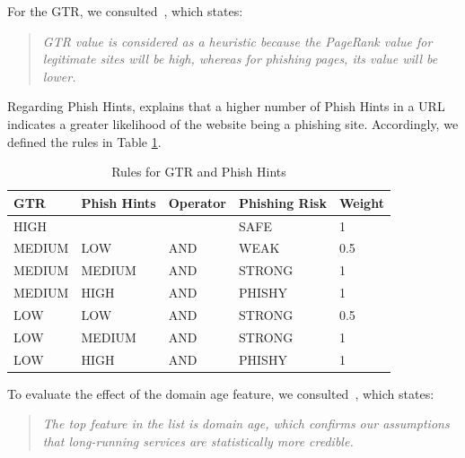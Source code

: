 \documentclass[11pt]{article}
\begin{document}
For the GTR, we consulted~\cite{GTR}, which states:

\begin{quote}
    \textit{GTR value is considered as a heuristic because the PageRank value for legitimate sites will be high, whereas for phishing pages, its value will be lower.}
\end{quote}

Regarding Phish Hints, \cite{mainpaper} explains that a higher number of Phish Hints in a URL indicates a greater likelihood of the website being a phishing site. Accordingly, we defined the rules in Table \ref{page_rank_phish_hints_rules}.

\begin{table}[h]
    \centering
    \begin{tabular}{|l|l|l|l|l|}
    \hline
    \textbf{GTR} & \textbf{Phish Hints} & \textbf{Operator} & \textbf{Phishing Risk} & \textbf{Weight} \\ \hline
    HIGH               &                     &                   & SAFE                   & 1               \\ \hline
    MEDIUM             & LOW                 & AND               & WEAK                   & 0.5             \\ \hline
    MEDIUM             & MEDIUM              & AND               & STRONG                 & 1               \\ \hline
    MEDIUM             & HIGH                & AND               & PHISHY                 & 1               \\ \hline
    LOW                & LOW                 & AND               & STRONG                 & 0.5             \\ \hline
    LOW                & MEDIUM              & AND               & STRONG                 & 1               \\ \hline
    LOW                & HIGH                & AND               & PHISHY                 & 1               \\ \hline
    \end{tabular}
    \caption{Rules for GTR and Phish Hints}
    \label{page_rank_phish_hints_rules}
\end{table}

To evaluate the effect of the domain age feature, we consulted~\cite{domainage}, which states:

\begin{quote}
\textit{The top feature in the list is domain age, which confirms our assumptions that long-running services are statistically more credible.}
\end{quote}
\end{document}
